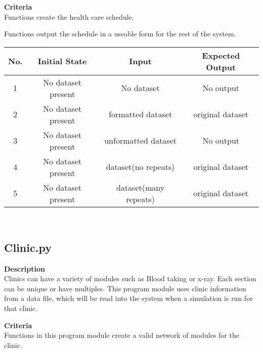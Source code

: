 \documentclass[12pt]{article}
\begin{document}
\quad

\textbf{Criteria}\\

Functions create the health care schedule.

Functions output the
schedule in a useable form for the rest of the system.\\

\quad


	
	
\begin{tabular}{|c|c|c|c|}
\hline
\textbf{No.}  & \textbf{Initial State} & \textbf{Input} & \textbf{Expected Output} 
\\ \hline
1  & No dataset present & No dataset & No output 
\\ \hline
2  & No dataset present & formatted dataset & original dataset 
\\ \hline
3  & No dataset present & unformatted dataset & No output 
\\ \hline
4  & No dataset present & dataset(no repeats) & original dataset 
\\ \hline
5  & No dataset present & dataset(many repeats) & original dataset
\\ \hline
\end{tabular}\\

\quad

\quad

\subsection{Clinic.py} 

\textbf{Description}\\

Clinics can have a variety of modules such as Blood taking or x-ray. Each section can be unique or have multiples. This program module uses clinic information from a data file, which will be read into the system when a simulation is run for that clinic.

\quad

\textbf{Criteria}\\

Functions in this program module create a valid network of modules for the clinic. \\

\quad
\end{document}
